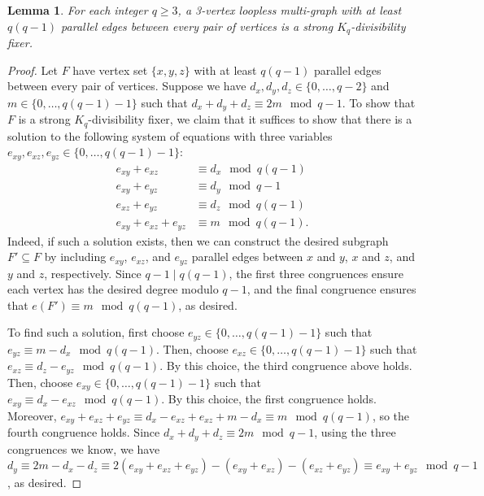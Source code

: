 \documentclass[11pt]{article}
\numberwithin{equation}{section}
\newcounter{i}
\theoremstyle{plain}
\newtheorem{lem}[thm]{Lemma}
\theoremstyle{plain} %
\theoremstyle{definition}
\begin{document}
\begin{lem}\label{lem:div-fixer-fat-triangle}
    For each integer $q \geq 3$, a 3-vertex loopless multi-graph with at least $q(q-1)$ parallel edges between every pair of vertices is a strong $K_q$-divisibility fixer. 
\end{lem}
\begin{proof}
    Let $F$ have vertex set $\{x,y,z\}$ with at least $q(q - 1)$ parallel edges between every pair of vertices.  
    Suppose we have $d_x, d_y, d_z \in \{0, \dots, q - 2\}$ and $m \in \{0, \dots, q(q - 1)-1\}$ such that $d_x + d_y + d_z \equiv 2m \mod q - 1$.  To show that $F$ is a strong $K_q$-divisibility fixer, we claim that it suffices to show that there is a solution to the following system of equations with three variables $e_{xy}, e_{xz}, e_{yz} \in \{0, \dots, q(q - 1) - 1\}$:
    \begin{align*}
        e_{xy} + e_{xz} &\equiv d_x \mod q(q - 1)\\
        e_{xy} + e_{yz} &\equiv d_y \mod q - 1\\
        e_{xz} + e_{yz} &\equiv d_z \mod q(q - 1)\\
        e_{xy} + e_{xz} + e_{yz} &\equiv m \mod q(q - 1).
    \end{align*}
    Indeed, if such a solution exists, then we can construct the desired subgraph $F' \subseteq F$ by including $e_{xy}$, $e_{xz}$, and $e_{yz}$ parallel edges between $x$ and $y$, $x$ and $z$, and $y$ and $z$, respectively.  Since $q - 1 \mid q(q - 1)$, the first three congruences ensure each vertex has the desired degree modulo $q - 1$, and the final congruence ensures that $e(F') \equiv m \mod q(q - 1)$, as desired.

    To find such a solution, first choose $e_{yz} \in \{0, \dots, q(q - 1)- 1\}$ such that $e_{yz} \equiv m - d_x \mod q(q - 1)$.  Then, choose $e_{xz} \in \{0, \dots, q(q - 1) - 1\}$ such that $e_{xz} \equiv d_z - e_{yz} \mod q(q - 1)$.  By this choice, the third congruence above holds.  Then, choose $e_{xy} \in \{0, \dots, q(q - 1) - 1\}$ such that $e_{xy} \equiv d_x - e_{xz} \mod q(q - 1)$.  By this choice, the first congruence holds.  Moreover, $e_{xy} + e_{xz} + e_{yz} \equiv d_x - e_{xz} + e_{xz} + m - d_x \equiv m \mod q(q - 1)$, so the fourth congruence holds.  Since $d_x + d_y + d_z \equiv 2m \mod q - 1$, using the three congruences we know, we have $d_y \equiv 2m - d_x - d_z \equiv 2(e_{xy} + e_{xz} + e_{yz}) - (e_{xy} + e_{xz}) - (e_{xz} + e_{yz}) \equiv e_{xy} + e_{yz} \mod q - 1$, as desired.
\end{proof}
\end{document}
